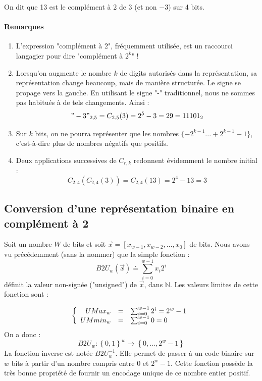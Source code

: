 On dit que 13 est le complément à 2 de 3 (et non $-3$) sur 4 bits.

\paragraph{Remarques}
\begin{enumerate}
  \item L'expression "complément à 2", fréquemment utilisée, est un raccourci langagier pour dire "complément à $2^k$" !
  \item Lorsqu'on augmente le nombre $k$ de digits autorisés dans la représentation, sa représentation change beaucoup, mais de manière structurée. Le signe se
  propage vers la gauche. En utilisant le signe "-" traditionnel, nous ne sommes pas habitués à de tels changements.
  Ainsi :
  $$"-3"_{2,5}=C_{2,5}(3)=2^5-3=29=11101_2$$
  \item Sur $k$ bits, on ne pourra représenter que les nombres $\{-2^{k-1}...+2^{k-1}-1\}$, c'est-à-dire plus de nombres négatifs que positifs.
  \item Deux applications successives de $C_{r,k}$ redonnent évidemment le nombre initial : $$C_{2,4}(C_{2,4}(3))=C_{2,4}(13)=2^4-13=3$$
\end{enumerate}



\subsection{Conversion d'une représentation binaire en complément à 2}
Soit un nombre $W$ de bits et soit $\vec{x}=[x_{w-1},x_{w-2},\dots,x_0]$ de bits. Nous avons vu précédemment (sans la nommer) que la simple fonction :
$$B2U_w(\vec{x}) \doteq \sum_{i=0}^{w-1}x_i2^i$$ définit la valeur non-signée ("unsigned") de $\vec{x}$, dans $\mathbb{N}$. Les valeurs limites de cette fonction sont :

\[
\left\{
\begin{array}{r c l}
UMax_w  &=& \sum_{i=0}^{w-1}2^i=2^w-1 \\
UMmin_w &=& \sum_{i=0}^{w-1}0=0
\end{array}
\right.
\]
On a donc : $$B2U_w : \left\{0,1 \right\}^w \rightarrow \left\{0,\dots,2^w-1\right\} $$
La fonction inverse est notée $B2U_w^{-1}$.
Elle permet de passer à un code binaire sur $w$ bits à partir d'un nombre compris entre $0$ et $2^w-1$.
Cette fonction possède la très bonne propriété de fournir un encodage unique de ce nombre entier positif.\\

